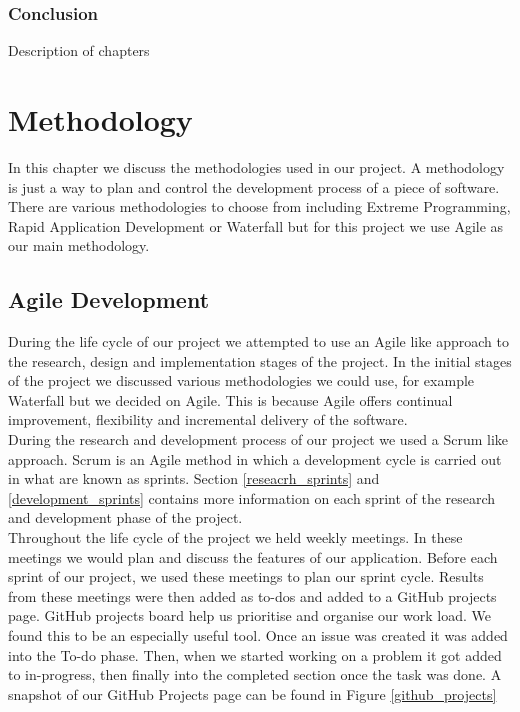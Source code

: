 \subsection{Conclusion}
Description of chapters


\chapter{Methodology}
In this chapter we discuss the methodologies used in our project. A methodology is just a way to plan and control the development process of a piece of software. There are various methodologies to choose from including Extreme Programming, Rapid Application Development or Waterfall but for this project we use Agile as our main methodology.

\section{Agile Development}
During the life cycle of our project we attempted to use an Agile like approach to the research, design and implementation stages of the project. In the initial stages of the project we discussed various methodologies we could use, for example Waterfall but we decided on Agile. This is because Agile offers continual improvement, flexibility and incremental delivery of the software.  \\

\noindent During the research and development process of our project we used a Scrum like approach. Scrum is an Agile method in which a development cycle is carried out in what are known as sprints. Section \ref{reseacrh_sprints} and \ref{development_sprints} contains more information on each sprint of the research and development phase of the project. \\

\noindent Throughout the life cycle of the project we held weekly meetings. In these meetings we would plan and discuss the features of our application. Before each sprint of our project, we used these meetings to plan our sprint cycle. Results from these meetings were then added as to-dos and added to a GitHub projects page. GitHub projects board help us prioritise and organise our work load. We found this to be an especially useful tool. Once an issue was created it was added into the To-do phase. Then, when we started working on a problem it got added to in-progress, then finally into the completed section once the task was done. A snapshot of our GitHub Projects page can be found in Figure \ref{github_projects}  \\

